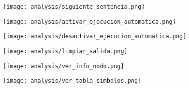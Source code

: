 \begin{multicols}{2}
\begin{center}
\texttt{[image: analysis/siguiente\_sentencia.png]} 
\end{center}
\columnbreak
\begin{center}
\texttt{[image: analysis/activar\_ejecucion\_automatica.png]} 
\end{center}
\end{multicols}

\begin{multicols}{2}
\begin{center}
\texttt{[image: analysis/desactivar\_ejecucion\_automatica.png]} 
\end{center}
\columnbreak
\begin{center}
\texttt{[image: analysis/limpiar\_salida.png]} 
\end{center}
\end{multicols}

\begin{multicols}{2}
\begin{center}
\texttt{[image: analysis/ver\_info\_nodo.png]} 
\end{center}
\columnbreak
\begin{center}
\texttt{[image: analysis/ver\_tabla\_simbolos.png]} 
\end{center}
\end{multicols}

